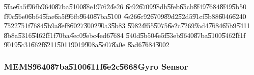 \U{5fae}\U{6a5f}\U{96fb}\U{9640}\U{87ba}\U{5100}\U{88e1}\U{9762}\U{4e26}%
\U{6c92}\U{6709}\U{98db}\U{5feb}\U{65cb}\U{8f49}\U{7684}\U{8f49}\U{5b50}%
\U{ff0c}\U{56e0}\U{6b64}\U{5fae}\U{6a5f}\U{96fb}\U{9640}\U{87ba}\U{5100}%
\U{4e26}\U{6c92}\U{6709}\U{89d2}\U{52d5}\U{91cf}\U{5b88}\U{6046}\U{6240}%
\U{7522}\U{751f}\U{7684}\U{5b9a}\U{8ef8}\U{6027}\U{3002}\U{90a3}\U{5b83}%
\U{5982}\U{4f55}\U{5075}\U{6e2c}\U{7269}\U{9ad4}\U{7684}\U{65b9}\U{5411}%
\U{8b8a}\U{5316}\U{5462}\U{ff1f}\U{70ba}\U{4ec0}\U{9ebc}\U{4ed6}\U{7684}%
\U{540d}\U{5b50}\U{4e5f}\U{53eb}\U{9640}\U{87ba}\U{5100}\U{5462}\U{ff1f}%
\U{9019}\U{5c31}\U{662f}\U{6211}\U{5011}\U{9019}\U{908a}\U{5c07}\U{8a0e}%
\U{8ad6}\U{7684}\U{3002}

\subsubsection{MEMS\U{9640}\U{87ba}\U{5100}\U{611f}\U{6e2c}\U{5668}Gyro
Sensor}

